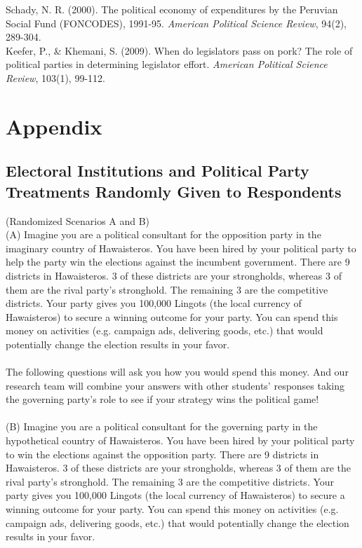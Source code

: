 \documentclass{article}
\begin{document}
Schady, N. R. (2000). The political economy of expenditures by the Peruvian Social Fund (FONCODES), 1991-95. \textit{American Political Science Review}, 94(2), 289-304.\\

Keefer, P., \& Khemani, S. (2009). When do legislators pass on pork? The role of political parties in determining legislator effort. \textit{American Political Science Review}, 103(1), 99-112.
\section{Appendix} 
\subsection{Electoral Institutions and Political Party Treatments Randomly Given to Respondents}
(Randomized Scenarios A and B)\\
(A) Imagine you are a political consultant for the opposition party in the imaginary country of Hawaisteros. You have been hired by your political party to help the party win the elections against the incumbent government. There are 9 districts in Hawaisteros. 3 of these districts are your strongholds, whereas 3 of them are the rival party's stronghold. The remaining 3 are the competitive districts. Your party gives you 100,000 Lingots (the local currency of Hawaisteros) to secure a winning outcome for your party. You can spend this money on activities (e.g. campaign ads, delivering goods, etc.) that would potentially change the election results in your favor. \\
\\
The following questions will ask you how you would spend this money. And our research team will combine your answers with other students' responses taking the governing party's role to see if your strategy wins the political game!\\
\\
(B) Imagine you are a political consultant for the governing party in the hypothetical country of Hawaisteros. You have been hired by your political party to win the elections against the opposition party. There are 9 districts in Hawaisteros. 3 of these districts are your strongholds, whereas 3 of them are the rival party's stronghold. The remaining 3 are the competitive districts. Your party gives you 100,000 Lingots (the local currency of Hawaisteros) to secure a winning outcome for your party. You can spend this money on activities (e.g. campaign ads, delivering goods, etc.) that would potentially change the election results in your favor.\\
\end{document}
